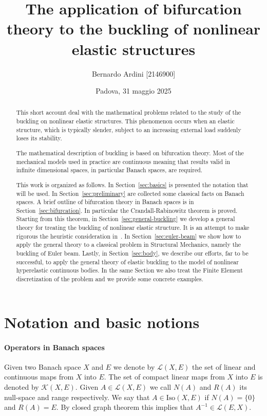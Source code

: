 \documentclass[a4paper,11pt]{article}
\theoremstyle{definition}
\begin{document}
\author{Bernardo Ardini [2146900]}
\date{Padova, 31 maggio 2025}
\title{\bfseries The application of bifurcation theory to the buckling of nonlinear elastic structures}

\maketitle

\begin{abstract}
This short account deal with the mathematical problems related to the study of the buckling on nonlinear elastic structures. This phenomenon occurs when an elastic structure, which is typically slender, subject to an increasing external load suddenly loses its stability.

The mathematical description of buckling is based on bifurcation theory. Most of the mechanical models used in practice are continuous meaning that results valid in infinite dimensional spaces, in particular Banach spaces, are required.

This work is organized as follows. In Section~\ref{sec:basics} is presented the notation that will be used. In Section~\ref{sec:preliminary} are collected some classical facts on Banach spaces. A brief outline of bifurcation theory in Banach spaces is in Section~\ref{sec:bifurcation}. In particular the Crandall-Rabinowitz theorem is proved. Starting from this theorem, in Section~\ref{sec:general-buckling} we develop a general theory for treating the buckling of nonlinear elastic structure. It is an attempt to make rigorous the heuristic consideration in~\cite{casciaro}. In Section~\ref{sec:euler-beam} we show how to apply the general theory to a classical problem in Structural Mechanics, namely the buckling of Euler beam. Lastly, in Section~\ref{sec:body}, we describe our efforts, far to be successful, to apply the general theory of elastic buckling to the model of nonlinear hyperelastic continuous bodies. In the same Section we also treat the Finite Element discretization of the problem and we provide some concrete examples.
\end{abstract}

\tableofcontents

\section{Notation and basic notions}
\label{sec:basics}

\paragraph{Operators in Banach spaces} Given two Banach space $X$ and $E$ we denote by $\mathscr{L}(X,E)$ the set of linear and continuous maps from $X$ into $E$. The set of compact linear maps from $X$ into $E$ is denoted by $\mathscr{K}(X,E)$. Given $A\in\mathscr{L}(X,E)$ we call $N(A)$ and $R(A)$ its null-space and range respectively. We say that $A\in\text{Iso}(X,E)$ if $N(A)=\{0\}$ and $R(A)=E$. By closed graph theorem this implies that $A^{-1}\in\mathscr{L}(E,X)$.
\end{document}
